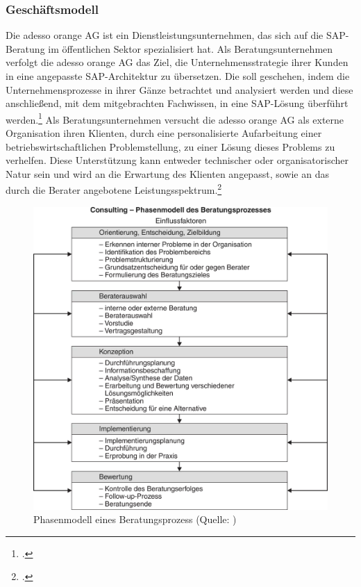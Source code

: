 \subsubsection{Geschäftsmodell}
Die adesso orange AG ist ein Dienstleistungsunternehmen, das sich auf die SAP-Beratung im öffentlichen Sektor spezialisiert hat. Als Beratungsunternehmen verfolgt die adesso orange AG das Ziel, die Unternehmensstrategie ihrer Kunden in eine angepasste SAP-Architektur zu übersetzen. Die soll geschehen, indem die Unternehmensprozesse in ihrer Gänze betrachtet und analysiert werden und diese anschließend, mit dem mitgebrachten Fachwissen, in eine SAP-Lösung überführt werden.\footcite[Vgl.][]{ao-main} Als Beratungsunternehmen versucht die adesso orange AG als externe Organisation ihren Klienten, durch eine personalisierte Aufarbeitung einer betriebswirtschaftlichen Problemstellung, zu einer Lösung dieses Problems zu verhelfen. Diese Unterstützung kann entweder technischer oder organisatorischer Natur sein und wird an die Erwartung des Klienten angepasst, sowie an das durch die Berater angebotene Leistungsspektrum.\footcite[Vgl.][]{gabler-beratung}
\begin{figure}[h!]
    \centering
    \includegraphics[scale=0.4]{./Bilder/Beratungsprozess.png}
    \caption[Phasenmodell eines Beratungsprozess]{Phasenmodell eines Beratungsprozess (Quelle: \cite[][]{gabler-beratung})}
\end{figure}
